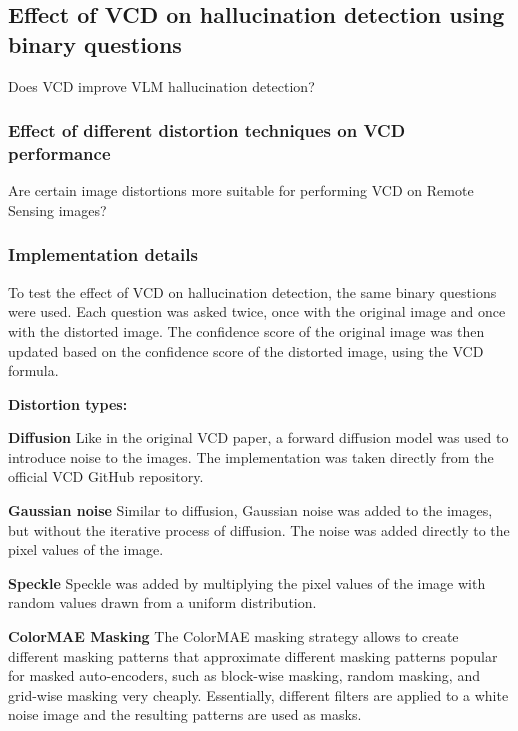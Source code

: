 \subsection{Effect of VCD on hallucination detection using binary questions}

\begin{formal}
	Does VCD improve VLM hallucination detection?
\end{formal}


\subsubsection{Effect of different distortion techniques on VCD performance}

\begin{formal}
	Are certain image distortions more suitable for performing VCD on Remote Sensing images?
\end{formal}

\subsubsection{Implementation details}
To test the effect of VCD on hallucination detection, the same binary questions were used. Each question was asked twice, once with the original image and once with the distorted image. The confidence score of the original image was then updated based on the confidence score of the distorted image, using the VCD formula.
\begin{description}
	\item \textbf{Distortion types:}
	      \begin{description}
		      \item \textbf{Diffusion} Like in the original VCD paper, a forward diffusion model was used to introduce noise to the images. The implementation was taken directly from the official VCD GitHub repository.
		      \item \textbf{Gaussian noise} Similar to diffusion, Gaussian noise was added to the images, but without the iterative process of diffusion. The noise was added directly to the pixel values of the image.
		      \item \textbf{Speckle} Speckle was added by multiplying the pixel values of the image with random values drawn from a uniform distribution.
		      \item \textbf{ColorMAE Masking} The ColorMAE masking strategy allows to create different masking patterns that approximate different masking patterns popular for masked auto-encoders, such as block-wise masking, random masking, and grid-wise masking very cheaply. Essentially, different filters are applied to a white noise image and the resulting patterns are used as masks.
	      \end{description}

\end{description}


